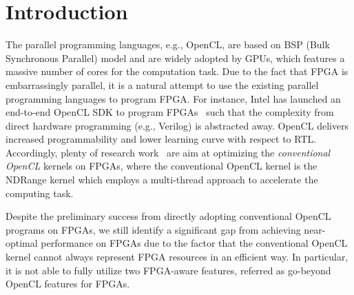 \section{Introduction}

The parallel programming languages, e.g., OpenCL, are based on BSP (Bulk Synchronous Parallel) model and are widely adopted by GPUs, which features a massive number of cores for the computation task. 
Due to the fact that FPGA is embarrassingly parallel, it is a natural attempt to use the existing parallel programming languages to program FPGA. For instance, Intel has launched an end-to-end OpenCL SDK to program FPGAs~\cite{altera_optimization} such that the complexity from direct hardware programming (e.g., Verilog) is abstracted away. OpenCL delivers increased programmability and lower learning curve with respect to RTL. Accordingly, plenty of research work~\cite{flexcl_tc18, opencl_compiler_ERSA12, fpga_opencl_model_hpca16} are aim at optimizing the \emph{conventional OpenCL} kernels on FPGAs, where the conventional OpenCL kernel is the NDRange kernel which employs a multi-thread approach to accelerate the computing task. 



Despite the preliminary success from directly adopting conventional OpenCL programs on FPGAs, we still identify a significant gap from achieving near-optimal performance on FPGAs due to the factor that the conventional OpenCL kernel cannot always represent FPGA resources in an efficient way. In particular, it is not able to fully utilize two FPGA-aware features, referred as go-beyond OpenCL features for FPGAs. %

